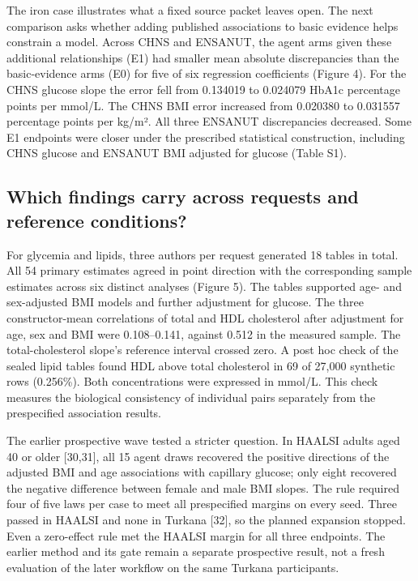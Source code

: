 \documentclass[sigconf,review]{acmart}
\begin{document}
The iron case illustrates what a fixed source packet leaves open. The next comparison asks whether adding published associations to basic evidence helps constrain a model. Across CHNS and ENSANUT, the agent arms given these additional relationships (E1) had smaller mean absolute discrepancies than the basic-evidence arms (E0) for five of six regression coefficients (Figure 4). For the CHNS glucose slope the error fell from 0.134019 to 0.024079 HbA1c percentage points per mmol/\allowbreak{}L. The CHNS BMI error increased from 0.020380 to 0.031557 percentage points per kg/\allowbreak{}m². All three ENSANUT discrepancies decreased. Some E1 endpoints were closer under the prescribed statistical construction, including CHNS glucose and ENSANUT BMI adjusted for glucose (Table S1).


\subsection{Which findings carry across requests and reference conditions?}

For glycemia and lipids, three authors per request generated 18 tables in total. All 54 primary estimates agreed in point direction with the corresponding sample estimates across six distinct analyses (Figure 5). The tables supported age- and sex-adjusted BMI models and further adjustment for glucose. The three constructor-mean correlations of total and HDL cholesterol after adjustment for age, sex and BMI were 0.108–\allowbreak{}0.141, against 0.512 in the measured sample. The total-cholesterol slope's reference interval crossed zero. A post hoc check of the sealed lipid tables found HDL above total cholesterol in 69 of 27,000 synthetic rows (0.256\%). Both concentrations were expressed in mmol/\allowbreak{}L. This check measures the biological consistency of individual pairs separately from the prespecified association results.


The earlier prospective wave tested a stricter question. In HAALSI adults aged 40 or older [30,31], all 15 agent draws recovered the positive directions of the adjusted BMI and age associations with capillary glucose; only eight recovered the negative difference between female and male BMI slopes. The rule required four of five laws per case to meet all prespecified margins on every seed. Three passed in HAALSI and none in Turkana [32], so the planned expansion stopped. Even a zero-effect rule met the HAALSI margin for all three endpoints. The earlier method and its gate remain a separate prospective result, not a fresh evaluation of the later workflow on the same Turkana participants.
\end{document}
